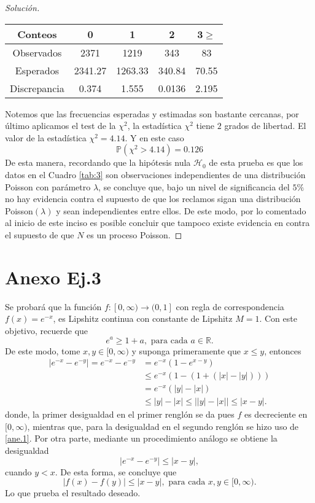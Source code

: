 \documentclass[10.5pt,notitlepage]{article}
\newenvironment{solucion}
  {\begin{proof}[Solución]}
  {\end{proof}}
\newcommand{\RR}{\mathbb{R}}
\newcommand{\abs}[1]{\left\lvert #1 \right\rvert}
\theoremstyle{plain}
\begin{document}
\begin{solucion}
\begin{center}
\begin{tabular}{| c | c | c | c |c | }
\hline
Conteos & 0 & 1 & 2 & 3$\geq$ \\ \hline
Observados &  2371 &1219  &343 &  83 \\
Esperados &   2341.27& 1263.33& 340.84&70.55 \\
Discrepancia &   0.374 & 1.555& 0.0136 &2.195 \\
 \hline
\end{tabular}
    
\end{center}
Notemos que las frecuencias esperadas y estimadas son bastante cercanas, por último aplicamos el test de la $\chi^2$,  la estadística  $\chi^2$ tiene $2$ grados de libertad. El valor de la estadística $\chi^2=4.14$.
Y en este caso
\[\mathbb{P}(\chi^2 > 4.14) = 0.126\]
De esta manera, recordando que la hipótesis nula \(\mathcal{H}_0\) de esta prueba es que los datos en el Cuadro \eqref{tab:3} son observaciones independientes de una distribución Poisson con parámetro \(\lambda\), se concluye que, bajo un nivel de significancia del \(5\%\) no hay evidencia contra el supuesto de que los reclamos sigan una distribución Poisson\((\lambda)\) y sean independientes entre ellos. De este modo, por lo comentado al inicio de este inciso es posible concluir que tampoco existe evidencia en contra el supuesto de que $N$ es un proceso Poisson.
\end{solucion}
\section{Anexo Ej.3}\label{Ane.3}
Se probará que la función \(f:[0,\infty) \to (0,1]\) con regla de correspondencia \(f(x) = e^{-x}\), es Lipshitz continua con constante de Lipshitz \(M = 1\). Con este objetivo, recuerde que 
\begin{equation}\label{ane.1}
e^{a} \geq 1 + a, \text{ para cada } a \in \RR.    
\end{equation}
De este modo, tome \(x , y \in [0,\infty)\) y suponga primeramente que \(x \leq y\), entonces  
\begin{align*}
    \abs{e^{-x} - e^{-y}} = e^{-x} - e^{-y} &=  e^{-x}(1 - e^{x-y})\\ 
                                            &\leq e^{-x}(1- (1 + (\abs{x} - \abs{y})))\\ 
                                            &= e^{-x}(\abs{y} - \abs{x}) \\
                                            &\leq \abs{y} - \abs{x} \leq \abs{\abs{y} - \abs{x}} \leq \abs{x - y}.
\end{align*}
donde, la primer desigualdad en el primer renglón se da pues \(f\) es decreciente en \([0,\infty)\), mientras que, para la desigualdad en el segundo renglón se hizo uso de \eqref{ane.1}. Por otra parte, mediante un procedimiento análogo se obtiene la desigualdad
\[
 \abs{e^{-x} - e^{-y}} \leq \abs{x - y},
\]
cuando \(y < x\). De esta forma, se concluye que 
\[
\abs{f(x) - f(y)} \leq \abs{x -y}, \text{ para cada } x,y\in[0,\infty).
\]
Lo que prueba el resultado deseado. 
\end{document}
